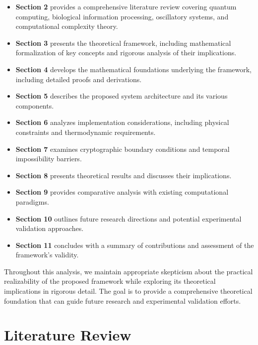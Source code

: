 \documentclass[12pt,a4paper]{article}
\theoremstyle{definition}
\begin{document}
\begin{itemize}
\item \textbf{Section 2} provides a comprehensive literature review covering quantum computing, biological information processing, oscillatory systems, and computational complexity theory.

\item \textbf{Section 3} presents the theoretical framework, including mathematical formalization of key concepts and rigorous analysis of their implications.

\item \textbf{Section 4} develops the mathematical foundations underlying the framework, including detailed proofs and derivations.

\item \textbf{Section 5} describes the proposed system architecture and its various components.

\item \textbf{Section 6} analyzes implementation considerations, including physical constraints and thermodynamic requirements.

\item \textbf{Section 7} examines cryptographic boundary conditions and temporal impossibility barriers.

\item \textbf{Section 8} presents theoretical results and discusses their implications.

\item \textbf{Section 9} provides comparative analysis with existing computational paradigms.

\item \textbf{Section 10} outlines future research directions and potential experimental validation approaches.

\item \textbf{Section 11} concludes with a summary of contributions and assessment of the framework's validity.
\end{itemize}

Throughout this analysis, we maintain appropriate skepticism about the practical realizability of the proposed framework while exploring its theoretical implications in rigorous detail. The goal is to provide a comprehensive theoretical foundation that can guide future research and experimental validation efforts.

\section{Literature Review}
\end{document}
